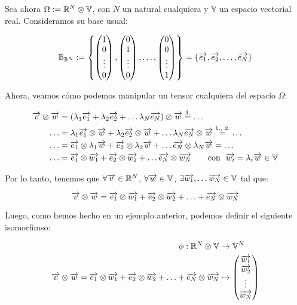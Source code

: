 \begin{ejemplo}
    Sea ahora $\Omega := \mathbb{R}^N \otimes \mathbb{V}$, con $N$ un natural cualquiera y $\mathbb{V}$ un espacio vectorial real. Consideramos su base usual:

    $$\mathbb{B}_{\mathbb{R}^N} := \left\{\begin{pmatrix} 1 \\ 0 \\ \vdots \\ 0 \end{pmatrix}, \begin{pmatrix} 0 \\ 1 \\ \vdots \\ 0 \end{pmatrix}, \ldots, \begin{pmatrix} 0 \\ 0 \\ \vdots \\ 1 \end{pmatrix} \right\} = \left\{\overrightarrow{e_1}, \overrightarrow{e_2}, \ldots, \overrightarrow{e_N} \right\}$$

    Ahora, veamos cómo podemos manipular un tensor cualquiera del espacio $\Omega$:

    \begin{equation}
    \begin{split}
        \overrightarrow{v} \otimes \overrightarrow{w} &= (\lambda_1 \overrightarrow{e_1} + \lambda_2 \overrightarrow{e_2} + \ldots \lambda_N \overrightarrow{e_N}) \otimes \overrightarrow{w} \stackrel{\text{3.}}{=} \ldots \\
        \ldots &= \lambda_1 \overrightarrow{e_1} \otimes \overrightarrow{w} + \lambda_2 \overrightarrow{e_2} \otimes \overrightarrow{w} + \ldots \lambda_N \overrightarrow{e_N} \otimes \overrightarrow{w} \stackrel{\text{1., 2.}}{=} \ldots \\
        \ldots &= \overrightarrow{e_1} \otimes \lambda_1 \overrightarrow{w} + \overrightarrow{e_2} \otimes \lambda_2 \overrightarrow{w} + \ldots \overrightarrow{e_N} \otimes \lambda_N \overrightarrow{w} = \ldots \\
        \ldots &= \overrightarrow{e_1} \otimes \overrightarrow{w_1} + \overrightarrow{e_2} \otimes \overrightarrow{w_2} + \ldots \overrightarrow{e_N} \otimes \overrightarrow{w_N} \qquad \text{con} \ \  \overrightarrow{w_i} = \lambda_i \overrightarrow{w} \in \mathbb{V}
    \end{split}
    \end{equation}

    Por lo tanto, tenemos que $\forall \overrightarrow{v} \in \mathbb{R}^N$, $\forall \overrightarrow{w} \in \mathbb{V}$, $\exists \overrightarrow{w_1}, \ldots \overrightarrow{w_N} \in \mathbb{V}$ tal que:

    $$\overrightarrow{v} \otimes \overrightarrow{w} = \overrightarrow{e_1} \otimes \overrightarrow{w_1} + \overrightarrow{e_2} \otimes \overrightarrow{w_2} + \ldots + \overrightarrow{e_N} \otimes \overrightarrow{w_N}$$

    Luego, como hemos hecho en un ejemplo anterior, podemos definir el siguiente isomorfimso:

    \begin{equation}
    \begin{split}
        \phi: \mathbb{R}^N \otimes \mathbb{V} &\to \mathbb{V}^N \\
        \overrightarrow{v} \otimes \overrightarrow{w} = \overrightarrow{e_1} \otimes \overrightarrow{w_1} + \overrightarrow{e_2} \otimes \overrightarrow{w_2} + \ldots + \overrightarrow{e_N} \otimes \overrightarrow{w_N} &\mapsto \begin{pmatrix} \overrightarrow{w_1} \\ \overrightarrow{w_2} \\ \vdots \\ \overrightarrow{w_N} \end{pmatrix}
    \end{split}
    \end{equation}


\end{ejemplo}

